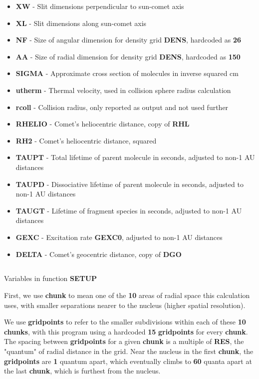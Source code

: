 \documentclass[11pt]{article}
\newcommand{\problempart}[1]{\subsection*{\contour{mybblack}{\textcolor{myblack}{#1}}}}
\newcommand{\fortranvar}[1]{\textcolor{myblue}{\textbf{#1}}}
\newcommand{\magicnumber}[1]{\textcolor{myred}{\textbf{#1}}}
\begin{document}
\begin{itemize}
    \item \fortranvar{XW} - Slit dimensions perpendicular to sun-comet axis
    \item \fortranvar{XL} - Slit dimensions along sun-comet axis
    \item \fortranvar{NF} - Size of angular dimension for density grid \fortranvar{DENS}, hardcoded as \magicnumber{26}
    \item \fortranvar{AA} - Size of radial dimension for density grid \fortranvar{DENS}, hardcoded as \magicnumber{150}
    \item \fortranvar{SIGMA} - Approximate cross section of molecules in inverse squared cm
    \item \fortranvar{utherm} - Thermal velocity, used in collision sphere radius calculation
    \item \fortranvar{rcoll} - Collision radius, only reported as output and not used further
    \item \fortranvar{RHELIO} - Comet's heliocentric distance, copy of \fortranvar{RHL}
    \item \fortranvar{RH2} - Comet's heliocentric distance, squared
    \item \fortranvar{TAUPT} - Total lifetime of parent molecule in seconds, adjusted to non-1 AU distances
    \item \fortranvar{TAUPD} - Dissociative lifetime of parent molecule in seconds, adjusted to non-1 AU distances
    \item \fortranvar{TAUGT} - Lifetime of fragment species in seconds, adjusted to non-1 AU distances
    \item \fortranvar{GEXC} - Excitation rate \fortranvar{GEXC0}, adjusted to non-1 AU distances
    \item \fortranvar{DELTA} - Comet's geocentric distance, copy of \fortranvar{DGO}
\end{itemize}

\problempart{Setup}
Variables in function \fortranvar{SETUP}

First, we use \textbf{chunk} to mean one of the \magicnumber{10} areas of radial space this calculation uses, with smaller separations nearer to the nucleus (higher spatial resolution).

We use \textbf{gridpoints} to refer to the smaller subdivisions within each of these \magicnumber{10} \textbf{chunks}, with this program using a hardcoded \magicnumber{15} \textbf{gridpoints} for every \textbf{chunk}.
The spacing between \textbf{gridpoints} for a given \textbf{chunk} is a multiple of \fortranvar{RES}, the "quantum" of radial distance in the grid.
Near the nucleus in the first \textbf{chunk}, the \textbf{gridpoints} are \magicnumber{1} quantum apart, which eventually climbs to \magicnumber{60} quanta apart at the last \textbf{chunk}, which is furthest from the nucleus.
\end{document}
